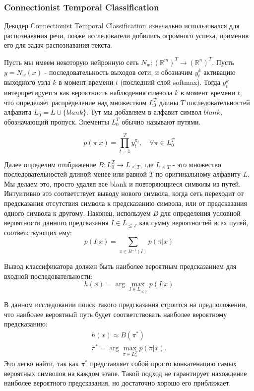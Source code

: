 \subsubsection{Connectionist Temporal Classification}
Декодер Connectionist Temporal Classification изначально использовался для распознавания речи, позже исследователи добились огромного успеха, применив его для задач распознавания текста.

Пусть мы имеем некоторую нейронную сеть $N_w : (\mathbb{R}^m)^T \rightarrow (\mathbb{R}^n)^T$. Пусть $y = N_w(x)$ - последовательность выходов сети, и обозначим $y_t^k$ активацию выходного узла $k$ в момент времени $t$ (последний слой softmax). Тогда $y_t^k$ интерпретируется как вероятность наблюдения символа $k$ в момент времени $t$, что определяет распределение над множеством $L_{0}^T$ длины $T$ последовательностей алфавита $L_0 = L \cup \{blank\}$. Тут мы добавляем в алфавит символ $blank$, обозначающий пропуск. Элементы $L_0^T$ обычно называют путями.

\begin{equation}
	p(\pi|x) = \prod_{t=1}^{T} y_t^{\pi_t}, \quad \forall \pi \in L_{0}^{T}
\end{equation}

Далее определим отображение $B: L_{0}^T \rightarrow L_{\leq T}$, где $L_{\leq T}$ - это множество последовательностей длиной менее или равной $T$ по оригинальному алфавиту $L$. Мы делаем это, просто удаляя все blank и повторяющиеся символы из путей. Интуитивно это соответствует выводу нового символа, когда сеть переходит от предсказания отсутствия символа к предсказанию символа, или от предсказания одного символа к другому. Наконец, используем $B$ для определения условной вероятности данного предсказания $I \in L_{\leq T}$ как сумму вероятностей всех путей, соответствующих ему:
\begin{equation}
	p(I|x) = \sum_{\pi \in B^{-1}(I)} p(\pi|x)
\end{equation}

Вывод классификатора должен быть наиболее вероятным предсказанием для входной последовательности:
\begin{equation}
	h(x) = \arg\max_{I \in L_{\leq T}} p(I|x)
\end{equation}

В данном исследовании поиск такого предсказания строится на предположении, что наиболее вероятный путь будет соответствовать наиболее вероятному предсказанию:
\begin{equation}
\begin{split}
	h(x) \approx B(\pi^{*}) \\
	\pi^{*} = \arg\max_{\pi \in L_0^T} p(\pi|x).
\end{split}
\end{equation}
Это легко найти, так как $\pi^{*}$ представляет собой просто конкатенацию самых вероятных символов на каждом этапе. Такой подход не гарантирует нахождение наиболее вероятного предсказания, но достаточно хорошо его приближает. 


